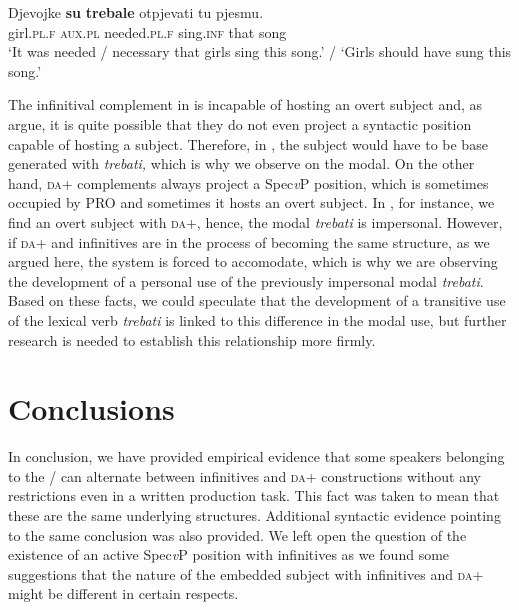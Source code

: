 \documentclass[output=paper,modfonts,newtxmath,hidelinks,]{langscibook}
\begin{document}
\ea \label{7:ex20}
\gll Djevojke \textbf{su} \textbf{trebale} otpjevati tu pjesmu.\\
     girl.\textsc{pl.f} \textsc{aux.pl} needed.\textsc{pl.f} sing.\textsc{inf} that song\\
\glt `It was needed / necessary that girls sing this song.' / `Girls should have sung this song.'
\z



\noindent The infinitival complement in  is incapable of hosting an overt subject and, as \citet{TodorovicWurmbrand2015} argue, it is quite possible that they do not even project a syntactic position capable of hosting a subject. Therefore, in , the subject would have to be base generated with \textit{trebati,} which is why we observe  on the modal. On the other hand, \textsc{da}+ complements always project a Spec\textit{v}P position, which is sometimes occupied by PRO and sometimes it hosts an overt subject. In , for instance, we find an overt subject with \textsc{da}+, hence, the modal \textit{trebati} is impersonal. However, if \textsc{da}+ and infinitives are in the process of becoming the same structure, as we argued here, the system is forced to accomodate, which is why we are observing the development of a personal use of the previously impersonal modal \textit{trebati}. Based on these facts, we could speculate that the development of a transitive use of the lexical verb \textit{trebati} is linked to this difference in the modal use, but further research is needed to establish this relationship more firmly.

\section{Conclusions}\label{7:s5}

In conclusion, we have provided empirical evidence that some speakers belonging to the /  can alternate between infinitives and \textsc{da}+ constructions without any restrictions even in a written production task. This fact was taken to mean that these are the same underlying structures. Additional syntactic evidence pointing to the same conclusion was also provided. We left open the question of the existence of an active Spec\textit{v}P position with infinitives as we found some suggestions that the nature of the embedded subject with infinitives and \textsc{da}+ might be different in certain respects.
\end{document}
